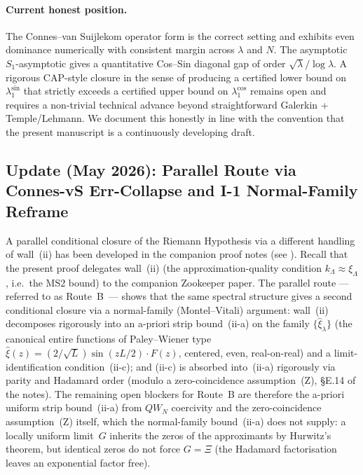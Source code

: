 \documentclass[11pt,a4paper]{article}
\theoremstyle{remark}
\theoremstyle{plain}
\begin{document}
\paragraph{Current honest position.} The Connes--van Suijlekom operator
form is the correct setting and exhibits even dominance numerically
with consistent margin across $\lambda$ and $N$.  The asymptotic
$S_1$-asymptotic gives a quantitative Cos--Sin diagonal gap of
order $\sqrt\lambda/\log\lambda$.  A rigorous CAP-style closure in the
sense of producing a certified lower bound on $\lambda_1^{\sin}$ that
strictly exceeds a certified upper bound on $\lambda_1^{\cos}$ remains
open and requires a non-trivial technical advance beyond
straightforward Galerkin + Temple/Lehmann.  We document this honestly
in line with the convention that the present manuscript is a
continuously developing draft.

\subsection{Update (May 2026): Parallel Route via Connes-vS Err-Collapse and I-1 Normal-Family Reframe}
\label{sec:route-b-parallel}

A parallel conditional closure of the Riemann Hypothesis via a
different handling of wall~(ii) has been developed in the companion
proof notes (see ).
Recall that the present proof delegates wall~(ii)
(the approximation-quality condition $k_\Lambda \approx \xi_\Lambda$,
i.e.\ the MS2 bound) to the companion Zookeeper paper.
The parallel route --- referred to as Route~B~--- shows that the same
spectral structure gives a second conditional closure via a
normal-family (Montel--Vitali) argument: wall~(ii) decomposes
rigorously into an a-priori strip bound~(ii-a) on the family
$\{\hat\xi_\lambda\}$ (the canonical entire functions of Paley--Wiener
type $\hat\xi(z) = (2/\sqrt L)\sin(zL/2)\cdot F(z)$, centered, even,
real-on-real) and a limit-identification condition~(ii-c); and (ii-c)
is absorbed into~(ii-a) rigorously via parity and Hadamard order
(modulo a zero-coincidence assumption~(Z), \S{}E.14 of the notes).
The remaining open blockers for Route~B are therefore the
a-priori uniform strip bound~(ii-a) from $QW_N$ coercivity
and the zero-coincidence assumption~(Z) itself, which the
normal-family bound~(ii-a) does not supply: a locally uniform
limit~$G$ inherits the zeros of the approximants by Hurwitz's
theorem, but identical zeros do not force $G=\Xi$ (the
Hadamard factorisation leaves an exponential factor free).
\end{document}
